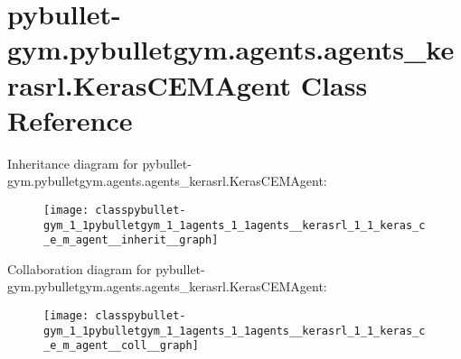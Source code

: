 \hypertarget{classpybullet-gym_1_1pybulletgym_1_1agents_1_1agents__kerasrl_1_1_keras_c_e_m_agent}{}\section{pybullet-\/gym.pybulletgym.\+agents.\+agents\+\_\+kerasrl.\+Keras\+C\+E\+M\+Agent Class Reference}
\label{classpybullet-gym_1_1pybulletgym_1_1agents_1_1agents__kerasrl_1_1_keras_c_e_m_agent}


Inheritance diagram for pybullet-\/gym.pybulletgym.\+agents.\+agents\+\_\+kerasrl.\+Keras\+C\+E\+M\+Agent\+:
\nopagebreak
\begin{figure}[H]
\begin{center}
\leavevmode
\texttt{[image: classpybullet-gym\_1\_1pybulletgym\_1\_1agents\_1\_1agents\_\_kerasrl\_1\_1\_keras\_c\_e\_m\_agent\_\_inherit\_\_graph]}
\end{center}
\end{figure}


Collaboration diagram for pybullet-\/gym.pybulletgym.\+agents.\+agents\+\_\+kerasrl.\+Keras\+C\+E\+M\+Agent\+:
\nopagebreak
\begin{figure}[H]
\begin{center}
\leavevmode
\texttt{[image: classpybullet-gym\_1\_1pybulletgym\_1\_1agents\_1\_1agents\_\_kerasrl\_1\_1\_keras\_c\_e\_m\_agent\_\_coll\_\_graph]}
\end{center}
\end{figure}
